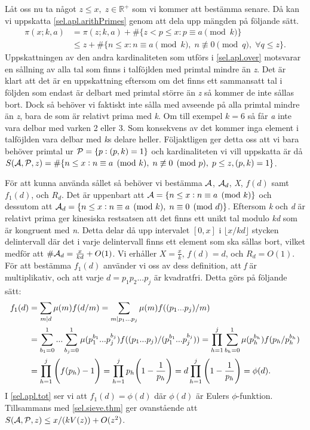 Låt oss nu ta något \(z\leq x,\; z \in \mathbb{R}^+\) som vi kommer att bestämma senare. Då kan vi uppskatta \eqref{sel.apl.arithPrimes} genom att dela upp mängden på följande sätt.
\begin{align}
    \pi(x;k,a) &= \pi(z;k,a) + \#\{z<p\leq x: p \equiv a \pmod{k}\} \nonumber\\
    &\leq z + \#\{n\leq x: n \equiv a \pmod k,\; n \not\equiv 0 \pmod q,\; \forall q\leq z\}.\label{sel.apl.over}
\end{align}
Uppskattningen av den andra kardinaliteten som utförs i \eqref{sel.apl.over} motsvarar en sållning av alla tal som finns i talföjlden med primtal mindre än \textit{z}. 
Det är klart att det är en uppskattning eftersom om det finns ett sammansatt tal i följden som endast är delbart med primtal större än \textit{z} så kommer de inte sållas bort. 
Dock så behöver vi faktiskt inte sålla med avseende på alla primtal mindre än \textit{z}, bara de som är relativt prima med \textit{k}. 
Om till exempel \(k = 6\) så får \textit{a} inte vara delbar med varken 2 eller 3.
Som konsekvens av det kommer inga element i talföjlden vara delbar med \textit{k}s delare heller.
Följaktligen ger detta oss att vi bara behöver primtal ur \(\P = \{p: (p, k) = 1\}\) och kardinaliteten vi vill uppskatta är då \(\S{A}{P}{z} = \#\{n\leq x: n \equiv a \pmod k,\; n \not\equiv 0 \pmod p,\; p\leq z, (p,k) = 1\}\).

För att kunna använda sållet så behöver vi bestämma \(\A\), \(\A_d\), \textit{X}, \(f(d)\) samt \(f_1(d)\), och \(R_d\). 
Det är uppenbart att \(\A = \{n\leq x: n \equiv a \pmod k\}\) och dessutom att \(\A_d = \{n \leq x: n \equiv a \pmod k,\; n \equiv 0 \pmod d\}\). 
Eftersom \textit{k} och \textit{d} är relativt prima ger kinesiska restsatsen att det finns ett unikt tal modulo \textit{kd} som är kongruent med \textit{n}. 
Detta delar då upp intervalet \([0, x]\) i \(\lfloor x/{kd}\rfloor\) stycken delintervall där det i varje delintervall finns ett element som ska sållas bort, vilket medför att \(\#\A_d = \frac{x}{kd} + O(1)\). 
Vi erhåller \(X = \frac{x}{k}\), \(f(d) = d\), och \(R_d = O(1)\). 
För att bestämma \(f_1(d)\) använder vi oss av dess definition, att \textit{f} är multiplikativ, och att varje \(d = p_1p_2...p_j\) är kvadratfri. 
Detta görs på följande sätt:
\begin{align}
    f_1(d) &= \sum_{m\divides d}\mu(m)f(d/m) = \sum_{m\divides p_1...p_j}\mu(m)f((p_1...p_j)/m) \nonumber\\
    &=\sum_{b_1 = 0}^1...\sum_{b_j = 0}^1\mu(p_1^{b_1}...p_j^{b_j})f((p_1...p_j)/(p_1^{b_1}...p_j^{b_j})) = \prod_{h = 1}^j\sum_{b_h = 0}^1\mu(p_h^{b_h})f(p_h/p_h^{b_h})\nonumber\\
    &= \prod_{h = 1}^j\Bigg(f(p_h) - 1\Bigg) = \prod_{h = 1}^j p_h\Bigg(1 - \frac{1}{p_h}\Bigg) = d\prod_{h = 1}^j \Bigg(1 - \frac{1}{p_h}\Bigg) = \phi(d).\label{sel.apl.tot}
\end{align}
I \eqref{sel.apl.tot} ser vi att \(f_1(d) = \phi(d)\) där \(\phi(d)\) är Eulers \(\phi\)-funktion. 
Tillsammans med \ref{sel.sieve.thm} ger ovanstående att \(\S{A}{P}{z} \leq x/(kV(z)) + O(z^2)\). 


